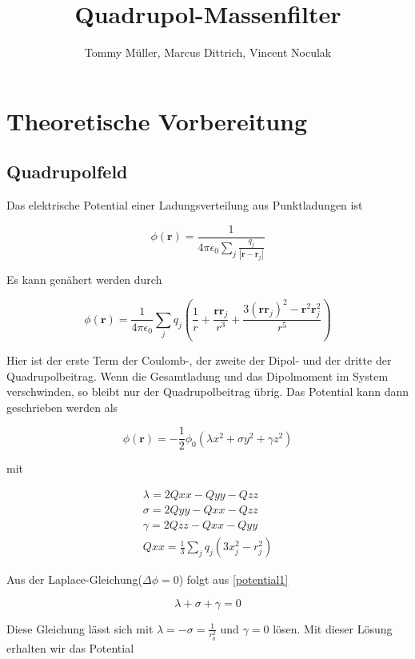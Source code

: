 \documentclass[10pt,a4paper]{article}
\author{Tommy Müller, Marcus Dittrich, Vincent Noculak}
\title{Quadrupol-Massenfilter}
\begin{document}
\section{Theoretische Vorbereitung}

\subsection{Quadrupolfeld}

Das elektrische Potential einer Ladungsverteilung aus Punktladungen ist

\begin{equation}
	\phi(\textbf{r}) = \frac{1}{4 \pi \epsilon_0 \sum_{j} \frac{q_j}{|\textbf{r}-\textbf{r}_j|}}
\end{equation}

Es kann genähert werden durch

\begin{equation}
	\phi(\textbf{r}) = \frac{1}{4 \pi \epsilon_0} \sum_{j} q_j (\frac{1}{r} + \frac{\textbf{r} \textbf{r}_j}{r^3} + \frac{3(\textbf{r}\textbf{r}_j)^2 - \textbf{r}^2 \textbf{r}^2_j}{r^5})
\end{equation}

Hier ist der erste Term der Coulomb-, der zweite der Dipol- und der dritte der Quadrupolbeitrag. Wenn die Gesamtladung und das Dipolmoment im System verschwinden, so bleibt nur der Quadrupolbeitrag übrig. Das Potential kann dann geschrieben werden als

\begin{equation}
	\phi(\textbf{r}) =  - \frac{1}{2} \phi _0 (\lambda x^2 + \sigma y^2 + \gamma z^2)
	\label{potential1}
\end{equation}

mit

\begin{align}
	\lambda = 2 Q{xx} -Q{yy}-Q{zz}\\
	\sigma = 2 Q{yy}-Q{xx}-Q{zz}\\
	\gamma = 2 Q{zz}-Q{xx}-Q{yy}\\
	Q{xx} = \frac{1}{3} \sum_{j} q_j (3 x_j^2 - r_j^2)
\end{align}

Aus der Laplace-Gleichung($\Delta \phi = 0$) folgt aus \ref{potential1}

\begin{equation}
	\lambda + \sigma + \gamma = 0
\end{equation}

Diese Gleichung lässt sich mit $\lambda = - \sigma = \frac{1}{r_0^2}$ und $\gamma = 0$ lösen. Mit dieser Lösung erhalten wir das Potential
\end{document}
